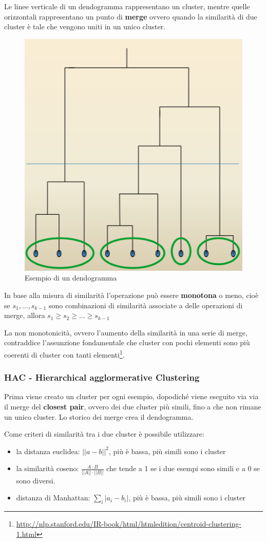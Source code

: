 Le linee verticale di un dendogramma rappresentano un cluster, mentre
quelle orizzontali rappresentano un punto di \textbf{merge} ovvero
quando la similarità di due cluster è tale che vengono uniti in un unico
cluster.

\begin{figure}[htbp]
\centering
\includegraphics[width=.5\textwidth]{./notes/immagini/l17-clustering.png}
\caption{Esempio di un dendogramma}
\end{figure}

In base alla misura di similarità l'operazione può essere
\textbf{monotona} o meno, cioè se $s_1, \ldots, s_{k-1}$ sono
combinazioni di similarità associate a delle operazioni di merge, allora
$s_1 \geq s_2 \geq \ldots \geq s_{k-1}$

La non monotonicità, ovvero l'aumento della similarità in una serie di merge, contraddice l'assunzione fondamentale che cluster con pochi elementi sono più coerenti di cluster con tanti elementi\footnote{\url{http://nlp.stanford.edu/IR-book/html/htmledition/centroid-clustering-1.html}}.

\subsubsection{HAC - Hierarchical agglormerative
Clustering}\label{hac---hierarchical-agglormerative-clustering}

Prima viene creato un cluster per ogni esempio, dopodiché viene eseguito
via via il merge del \textbf{closest pair}, ovvero dei due cluster più
simili, fino a che non rimane un unico cluster. Lo storico dei merge
crea il dendogramma.

Come criteri di similarità tra i due cluster è possibile utilizzare:

\begin{itemize}
	\item la distanza euclidea: $||a-b||^2$, più è bassa, più simili sono i cluster
	\item la similarità coseno: $\frac{A \cdot B}{||A|| \cdot ||B||}$ che tende a 1 se i due esempi sono simili e a 0 se sono diversi.
	\item distanza di Manhattan: $\sum_i|a_i - b_i|$, più è bassa, più simili sono i cluster
\end{itemize}

